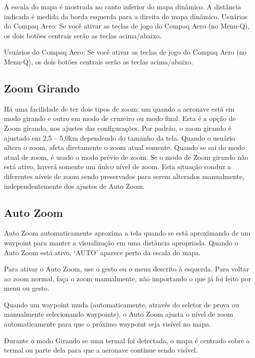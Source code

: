 A escala do mapa é mostrada no canto inferior do mapa dinâmico.  A distância indicada é medida da borda esquerda para a direita do mapa dinâmico.
Usuários do Compaq Aero:  Se você ativar as teclas de jogo do Compaq Aero (no Menu-Q), os dois botões centrais serão as teclas acima/abaixo.

Usuários do Compaq Aero:  Se você ativar as teclas de jogo do Compaq Aero (no Menu-Q), os dois botões centrais serão as teclas acima/abaixo.

\subsection*{Zoom Girando}
Há uma facilidade de ter dois tipos de zoom: um quando a aeronave está em modo girando e outro em modo de cruzeiro ou modo final.  Esta é a opção de Zoom girando, nos ajustes das configurações.  Por padrão, o zoom girando é ajustado em 2,5 – 5,0km dependendo do tamanho da tela.  Quando o usuário altera o zoom, afeta diretamente o zoom atual somente.  Quando se sai do modo atual de zoom, é usado o modo prévio de zoom. Se o modo de Zoom girando não está ativo, haverá somente um único nível de zoom.  Esta situação conduz a diferentes níveis de zoom sendo preservados para serem alterados manualmente, independentemente dos ajustes de Auto Zoom.
 
\subsection*{Auto Zoom}
Auto Zoom automaticamente aproxima a tela quando se está aproximando de um waypoint para manter a visualização em uma distância apropriada. 
Quando o Auto Zoom está ativo, ‘AUTO’ aparece perto da escala do mapa.

Para ativar o Auto Zoom, use o gesto  ou o menu descrito à esquerda. Para voltar ao zoom normal, faça o zoom manualmente, não importando o que já foi feito por menu ou gesto. 

Quando um waypoint muda (automaticamente, através do seletor de prova ou manualmente selecionando waypoints), o Auto Zoom ajusta o nível de zoom automaticamente para que o próximo waypoint seja visível no mapa.

Durante o modo Girando se uma termal foi detectada, o mapa é centrado sobre a termal ou parte dela para que a aeronave continue sendo visível.
 
